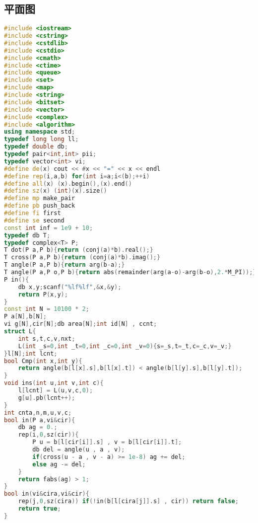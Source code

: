 \subsection{平面图}
\begin{lstlisting}[language=C++]
#include <iostream>
#include <cstring>
#include <cstdlib>
#include <cstdio>
#include <cmath>
#include <ctime>
#include <queue>
#include <set>
#include <map>
#include <string>
#include <bitset>
#include <vector>
#include <complex>
#include <algorithm>
using namespace std;
typedef long long ll;
typedef double db;
typedef pair<int,int> pii;
typedef vector<int> vi;
#define de(x) cout << #x << "=" << x << endl
#define rep(i,a,b) for(int i=a;i<(b);++i)
#define all(x) (x).begin(),(x).end()
#define sz(x) (int)(x).size()
#define mp make_pair
#define pb push_back
#define fi first
#define se second
const int inf = 1e9 + 10;
typedef db T;
typedef complex<T> P;
T dot(P a,P b){return (conj(a)*b).real();}
T cross(P a,P b){return (conj(a)*b).imag();}
T angle(P a,P b){return arg(b-a);}
T angle(P a,P o,P b){return abs(remainder(arg(a-o)-arg(b-o),2.*M_PI));}
P in(){
    db x,y;scanf("%lf%lf",&x,&y);
    return P(x,y);
}
const int N = 10100 * 2;
P a[N],b[N];
vi g[N],cir[N];db area[N];int id[N] , ccnt;
struct L{
    int s,t,c,v,nxt;
    L(int _s=0,int _t=0,int _c=0,int _v=0){s=_s,t=_t,c=_c,v=_v;}
}l[N];int lcnt;
bool Cmp(int x,int y){
    return angle(b[l[x].s],b[l[x].t]) < angle(b[l[y].s],b[l[y].t]);
}
void ins(int u,int v,int c){
    l[lcnt] = L(u,v,c,0);
    g[u].pb(lcnt++);
}
int cnta,n,m,u,v,c;
bool in(P a,vi&cir){
    db ag = 0.;
    rep(i,0,sz(cir)){
        P u = b[l[cir[i]].s] , v = b[l[cir[i]].t];
        db del = angle(u , a , v);
        if(cross(u - a , v - a) >= 1e-8) ag += del;
        else ag -= del;
    }
    return fabs(ag) > 1;
}
bool in(vi&cira,vi&cir){
    rep(j,0,sz(cira)) if(!in(b[l[cira[j]].s] , cir)) return false;
    return true;
}


\end{lstlisting}
